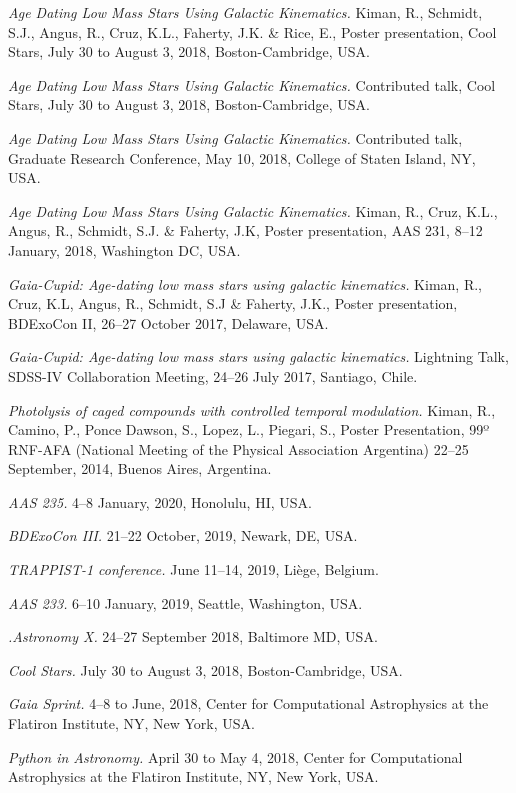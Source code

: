 \documentclass[10pt]{cv}
\begin{document}
\begin{llist}
\textit{Age Dating Low Mass Stars Using Galactic Kinematics.} Kiman, R., Schmidt, S.J., Angus, R., Cruz, K.L., Faherty, J.K. \& Rice, E., Poster presentation, Cool Stars, July 30 to August 3, 2018, Boston-Cambridge, USA.

\textit{Age Dating Low Mass Stars Using Galactic Kinematics.} Contributed talk, Cool Stars, July 30 to August 3, 2018, Boston-Cambridge, USA.

\textit{Age Dating Low Mass Stars Using Galactic Kinematics.} Contributed talk, Graduate Research Conference, May 10, 2018, College of Staten Island, NY, USA.

\textit{Age Dating Low Mass Stars Using Galactic Kinematics.} Kiman, R., Cruz, K.L., Angus, R., Schmidt, S.J. \& Faherty, J.K, Poster presentation, AAS 231, 8--12 January, 2018, Washington DC, USA. 

\textit{Gaia-Cupid: Age-dating low mass stars using galactic kinematics.} Kiman, R., Cruz, K.L, Angus, R., Schmidt, S.J \& Faherty, J.K., Poster presentation, BDExoCon II, 26--27 October 2017, Delaware, USA. 

\textit{Gaia-Cupid: Age-dating low mass stars using galactic kinematics.} Lightning Talk, SDSS-IV Collaboration Meeting, 24--26 July 2017, Santiago, Chile. 

\textit{Photolysis of caged compounds with controlled temporal modulation.} Kiman, R., Camino, P., Ponce Dawson, S., Lopez, L., Piegari, S., Poster Presentation, 99º RNF-AFA (National Meeting of the Physical Association Argentina) 22--25 September, 2014, Buenos Aires, Argentina.

\textit{AAS 235.} 4--8 January, 2020, Honolulu, HI, USA.

\textit{BDExoCon III.} 21--22 October, 2019, Newark, DE, USA.

\textit{TRAPPIST-1 conference.} June 11--14, 2019, Li\`ege, Belgium.

\textit{AAS 233.} 6--10 January, 2019, Seattle, Washington, USA.

\textit{.Astronomy X.} 24--27 September 2018, Baltimore MD, USA.

\textit{Cool Stars.} July 30 to August 3, 2018, Boston-Cambridge, USA.

\textit{Gaia Sprint.} 4--8 to June, 2018, Center for Computational Astrophysics at the Flatiron Institute, NY, New York, USA.

\textit{Python in Astronomy.}  April 30 to May 4, 2018, Center for Computational Astrophysics at the Flatiron Institute, NY, New York, USA. 


\end{llist}
\end{document}
